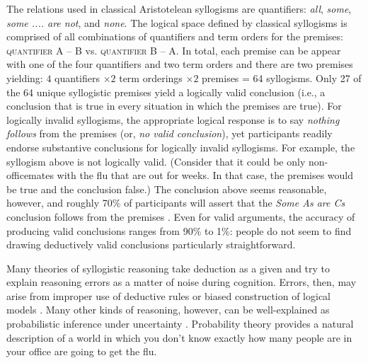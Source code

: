 \documentclass[floatsintext, doc]{apa6}
\begin{document}
The relations used in classical Aristotelean syllogisms are quantifiers: \emph{all}, \emph{some}, \emph{some .... are not}, and \emph{none}. 
The logical space defined by classical syllogisms is comprised of all combinations of quantifiers and term orders for the premises: \textsc{quantifier} \textsc{A} -- \textsc{B} vs. \textsc{quantifier} \textsc{B} -- \textsc{A}.
In total, each premise can be appear with one of the four quantifiers and two term orders and there are two premises yielding:  $4$ quantifiers  $\times 2$ term orderings $\times 2$ premises = 64 syllogisms.
Only 27 of the 64 unique syllogistic premises yield a logically valid conclusion (i.e., a conclusion that is true in every situation in which the premises are true).
For logically invalid syllogisms, the appropriate logical response is to say \emph{nothing follows} from the premises (or, \emph{no valid conclusion}), yet participants readily endorse substantive conclusions for logically invalid syllogisms. 
For example, the syllogism above is not logically valid.  (Consider that it could be only non-officemates with the flu that are out for weeks. In that case, the premises would be true and the conclusion false.)
The conclusion above seems reasonable, however, and roughly 70\% of participants will assert that the \emph{Some As are Cs} conclusion follows from the premises  \cite{Khemlani2012}.
Even for valid arguments, the accuracy of producing valid conclusions ranges from 90\% to 1\%: people do not seem to find drawing deductively valid conclusions particularly straightforward.


Many theories of syllogistic reasoning take deduction as a given and try to explain reasoning errors as a matter of noise during cognition. 
Errors, then, may arise from improper use of deductive rules \cite{rips1994, geurts2003reasoning} or biased construction of logical models \cite{JL1984, Newstead1992}. 
Many other kinds of reasoning, however, can be well-explained as probabilistic inference under uncertainty \cite{tenenbaum2006theory}. 
Probability theory provides a natural description of a world in which you don’t know exactly how many people are in your office are going to get the flu.
\end{document}
